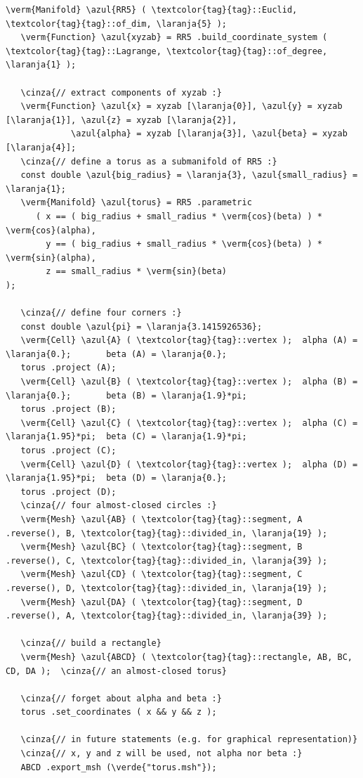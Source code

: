 \begin{Verbatim}[commandchars=\\\{\},formatcom=\small\tt,frame=single,
   label=parag-\ref{\numb section 2.\numb parag 17}.cpp,rulecolor=\color{coment},
   baselinestretch=0.94,framesep=2mm]
   \verm{Manifold} \azul{RR5} ( \textcolor{tag}{tag}::Euclid, \textcolor{tag}{tag}::of_dim, \laranja{5} );
   \verm{Function} \azul{xyzab} = RR5 .build_coordinate_system ( \textcolor{tag}{tag}::Lagrange, \textcolor{tag}{tag}::of_degree, \laranja{1} );

   \cinza{// extract components of xyzab :}
   \verm{Function} \azul{x} = xyzab [\laranja{0}], \azul{y} = xyzab [\laranja{1}], \azul{z} = xyzab [\laranja{2}],
             \azul{alpha} = xyzab [\laranja{3}], \azul{beta} = xyzab [\laranja{4}];
   \cinza{// define a torus as a submanifold of RR5 :}
   const double \azul{big_radius} = \laranja{3}, \azul{small_radius} = \laranja{1};
   \verm{Manifold} \azul{torus} = RR5 .parametric
      ( x == ( big_radius + small_radius * \verm{cos}(beta) ) * \verm{cos}(alpha),
        y == ( big_radius + small_radius * \verm{cos}(beta) ) * \verm{sin}(alpha),
        z == small_radius * \verm{sin}(beta)                                );
        
   \cinza{// define four corners :}
   const double \azul{pi} = \laranja{3.1415926536};
   \verm{Cell} \azul{A} ( \textcolor{tag}{tag}::vertex );  alpha (A) = \laranja{0.};       beta (A) = \laranja{0.};
   torus .project (A);
   \verm{Cell} \azul{B} ( \textcolor{tag}{tag}::vertex );  alpha (B) = \laranja{0.};       beta (B) = \laranja{1.9}*pi;
   torus .project (B);
   \verm{Cell} \azul{C} ( \textcolor{tag}{tag}::vertex );  alpha (C) = \laranja{1.95}*pi;  beta (C) = \laranja{1.9}*pi;
   torus .project (C);
   \verm{Cell} \azul{D} ( \textcolor{tag}{tag}::vertex );  alpha (D) = \laranja{1.95}*pi;  beta (D) = \laranja{0.};
   torus .project (D);
   \cinza{// four almost-closed circles :}
   \verm{Mesh} \azul{AB} ( \textcolor{tag}{tag}::segment, A .reverse(), B, \textcolor{tag}{tag}::divided_in, \laranja{19} );
   \verm{Mesh} \azul{BC} ( \textcolor{tag}{tag}::segment, B .reverse(), C, \textcolor{tag}{tag}::divided_in, \laranja{39} );
   \verm{Mesh} \azul{CD} ( \textcolor{tag}{tag}::segment, C .reverse(), D, \textcolor{tag}{tag}::divided_in, \laranja{19} );
   \verm{Mesh} \azul{DA} ( \textcolor{tag}{tag}::segment, D .reverse(), A, \textcolor{tag}{tag}::divided_in, \laranja{39} );

   \cinza{// build a rectangle}
   \verm{Mesh} \azul{ABCD} ( \textcolor{tag}{tag}::rectangle, AB, BC, CD, DA );  \cinza{// an almost-closed torus}

   \cinza{// forget about alpha and beta :}
   torus .set_coordinates ( x && y && z );

   \cinza{// in future statements (e.g. for graphical representation)}
   \cinza{// x, y and z will be used, not alpha nor beta :}
   ABCD .export_msh (\verde{"torus.msh"});
\end{Verbatim}

